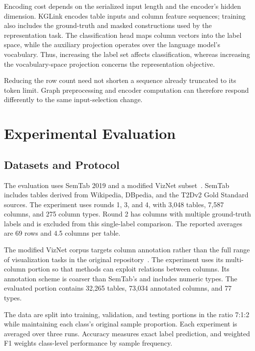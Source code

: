 Encoding cost depends on the serialized input length and the encoder's hidden dimension. KGLink encodes table inputs and column feature sequences; training also includes the ground-truth and masked constructions used by the representation task. The classification head maps column vectors into the label space, while the auxiliary projection operates over the language model's vocabulary. Thus, increasing the label set affects classification, whereas increasing the vocabulary-space projection concerns the representation objective.

Reducing the row count need not shorten a sequence already truncated to its token limit. Graph preprocessing and encoder computation can therefore respond differently to the same input-selection change.

\section{Experimental Evaluation}
\label{sec:kglink:experiments}

\subsection{Datasets and Protocol}
\label{sec:kglink:protocol}

The evaluation uses SemTab 2019 and a modified VizNet subset~\cite{kglink-hassanzadeh_oktie_2019_3518539,kglink-zhang2020sato}. SemTab includes tables derived from Wikipedia, DBpedia, and the T2Dv2 Gold Standard sources. The experiment uses rounds 1, 3, and 4, with 3,048 tables, 7,587 columns, and 275 column types. Round 2 has columns with multiple ground-truth labels and is excluded from this single-label comparison. The reported averages are 69 rows and 4.5 columns per table.

The modified VizNet corpus targets column annotation rather than the full range of visualization tasks in the original repository~\cite{kglink-hu2019viznet}. The experiment uses its multi-column portion so that methods can exploit relations between columns. Its annotation scheme is coarser than SemTab's and includes numeric types. The evaluated portion contains 32,265 tables, 73,034 annotated columns, and 77 types.

The data are split into training, validation, and testing portions in the ratio 7:1:2 while maintaining each class's original sample proportion. Each experiment is averaged over three runs. Accuracy measures exact label prediction, and weighted F1 weights class-level performance by sample frequency.

